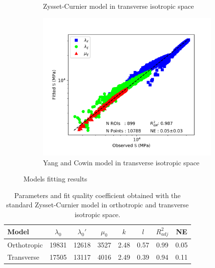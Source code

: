\documentclass[a4paper,fleqn]{DC_ArtStyle}
\begin{document}
\begin{figure}
\begin{subfigure}[t]{.3\linewidth}
			\caption{Zysset-Curnier model in transverse isotropic space}
		\end{subfigure}
		\begin{subfigure}[t]{.3\linewidth}
			\includegraphics[height=0.8\linewidth]{../Results/SpectralModel}
			\caption{Yang and Cowin model in transverse isotropic space}
		\end{subfigure}
		\caption{Models fitting results}
	\end{figure}
	\begin{table}[!h]
		\centering
		\caption{Parameters and fit quality coefficient obtained with the standard Zysset-Curnier model in orthotropic and transverse isotropic space.}
		\label{TabZysset}
		\begin{tabular}{l|c|c|c|c|c|c|c}
		\toprule
			Model & $\lambda_0$ & $\lambda_0'$ & $\mu_0$ &  $k$ &  $l$ & $R^2_{adj}$ &   NE \\
		\midrule
		Orthotropic &       19831 &        12618 &    3527 & 2.48 & 0.57 &        0.99 & 0.05 \\
		Transverse &       17505 &        13117 &    4016 & 2.49 & 0.39 &        0.94 & 0.11 \\
		\bottomrule
		\end{tabular}
	\end{table}
\end{document}
